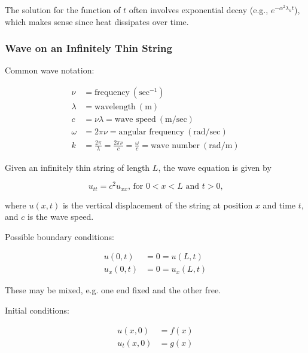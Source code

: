 The solution for the function of $t$ often involves exponential decay (e.g., $e^{-\alpha^2 \lambda_n t}$), which makes sense since heat dissipates over time.

\subsubsection{Wave on an Infinitely Thin String}

Common wave notation:

\begin{align*}
    \nu     & = \text{frequency}~(\text{sec}^{-1})                                                              \\
    \lambda & = \text{wavelength}~(\text{m})                                                                    \\
    c       & = \nu \lambda = \text{wave speed}~(\text{m/sec})                                                  \\
    \omega  & = 2\pi\nu = \text{angular frequency}~(\text{rad/sec})                                             \\
    k       & = \frac{2\pi}{\lambda} = \frac{2\pi\nu}{c} = \frac{\omega}{c} = \text{wave number}~(\text{rad/m})
\end{align*}

Given an infinitely thin string of length $L$, the wave equation is given by

\begin{equation*}
    u_{tt} = c^2 u_{xx}\text{, for } 0 < x < L \text{ and } t > 0\text{,}
\end{equation*}

where $u(x, t)$ is the vertical displacement of the string at position $x$ and time $t$, and $c$ is the wave speed.

\vsp

Possible boundary conditions:

\begin{align*}
    u(0, t)   & = 0 = u(L, t)   \tag{fixed ends} \\
    u_x(0, t) & = 0 = u_x(L, t) \tag{free ends}
\end{align*}

These may be mixed, e.g. one end fixed and the other free.

\vsp

Initial conditions:

\begin{align*}
    u(x, 0)   & = f(x) \\
    u_t(x, 0) & = g(x)
\end{align*}

